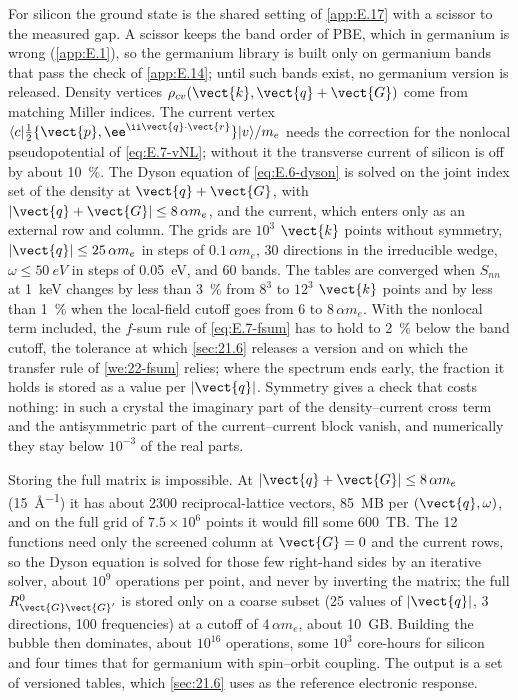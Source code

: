 For silicon the ground state is the shared setting of \cref{app:E.17} with a scissor to the measured gap. A scissor keeps the band order of PBE, which in germanium is wrong (\cref{app:E.1}), so the germanium library is built only on germanium bands that pass the check of \cref{app:E.14}; until such bands exist, no germanium version is released. Density vertices $\rho_{cv}(\vect{k},\vect{q}+\vect{G})$ come from matching Miller indices. The current vertex $\langle c|\tfrac12\{\vect{p},\ee^{\ii\vect{q}\cdot\vect{r}}\}|v\rangle/m_e$ needs the correction for the nonlocal pseudopotential of \cref{eq:E.7-vNL}; without it the transverse current of silicon is off by about \SI{10}{\percent}. The Dyson equation of \cref{eq:E.6-dyson} is solved on the joint index set of the density at $\vect{q}+\vect{G}$, with $|\vect{q}+\vect{G}| \le 8\,\alpha m_e$, and the current, which enters only as an external row and column. The grids are $10^3$ $\vect{k}$ points without symmetry, $|\vect{q}| \le 25\,\alpha m_e$ in steps of $0.1\,\alpha m_e$, 30 directions in the irreducible wedge, $\omega \le \SI{50}{eV}$ in steps of \SI{0.05}{eV}, and 60 bands. The tables are converged when $S_{nn}$ at \SI{1}{keV} changes by less than \SI{3}{\percent} from $8^3$ to $12^3$ $\vect{k}$ points and by less than \SI{1}{\percent} when the local-field cutoff goes from 6 to $8\,\alpha m_e$. With the nonlocal term included, the $f$-sum rule of \cref{eq:E.7-fsum} has to hold to \SI{2}{\percent} below the band cutoff, the tolerance at which \cref{sec:21.6} releases a version and on which the transfer rule of \cref{we:22-fsum} relies; where the spectrum ends early, the fraction it holds is stored as a value per $|\vect{q}|$. Symmetry gives a check that costs nothing: in such a crystal the imaginary part of the density--current cross term and the antisymmetric part of the current--current block vanish, and numerically they stay below $10^{-3}$ of the real parts.

Storing the full matrix is impossible. At $|\vect{q}+\vect{G}| \le 8\,\alpha m_e$ (\SI{15}{\angstrom^{-1}}) it has about 2300 reciprocal-lattice vectors, \SI{85}{MB} per $(\vect{q},\omega)$, and on the full grid of $7.5\times10^6$ points it would fill some \SI{600}{TB}. The 12 functions need only the screened column at $\vect{G} = 0$ and the current rows, so the Dyson equation is solved for those few right-hand sides by an iterative solver, about $10^9$ operations per point, and never by inverting the matrix; the full $R^0_{\vect{G}\vect{G}'}$ is stored only on a coarse subset (25 values of $|\vect{q}|$, 3 directions, 100 frequencies) at a cutoff of $4\,\alpha m_e$, about \SI{10}{GB}. Building the bubble then dominates, about $10^{16}$ operations, some $10^3$ core-hours for silicon and four times that for germanium with spin--orbit coupling. The output is a set of versioned tables, which \cref{sec:21.6} uses as the reference electronic response.

